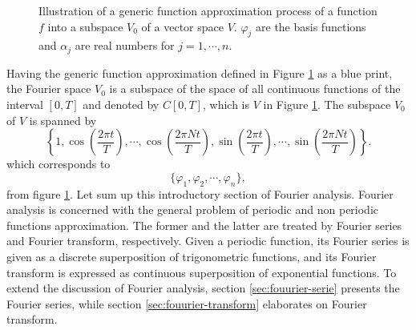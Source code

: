 \documentclass[../Main/thesis.tex]{subfiles}
\begin{document}
\begin{figure}[H]
\begin{center}
\end{center}
\caption{Illustration of a generic function approximation process of a function $f$ into a subspace $V_{0}$ of a vector space $V$. $\varphi_{j}$ are the basis functions and $\alpha_{j}$ are real numbers for $j=1,\cdots,n$.}
\label{figure:il}
\end{figure}

\justify
Having the generic function approximation defined in Figure \ref{figure:il} as a blue print, the Fourier space $V_{0}$ is a subspace of the space of all continuous functions of the interval $[0, T]$ and denoted by $C[0,T] $, which is $V$ in Figure \ref{figure:il}. The subspace $V_{0}$ of $V$ is spanned by 
\begin{equation}
\left\{1, \cos\left( \frac{2\pi t}{T} \right), \cdots,\cos\left( \frac{2\pi Nt}{T} \right), \sin\left( \frac{2\pi t}{T} \right), \cdots,\sin\left( \frac{2\pi Nt}{T} \right)   \right\}. \nonumber
\end{equation}
which corresponds to
\begin{equation}
\{\varphi_{1}, \varphi_{2}, \cdots, \varphi_{n}\}, \nonumber
\end{equation}
from figure \ref{figure:il}. 
\justify
Let sum up this introductory section of Fourier analysis. Fourier analysis is concerned with the general problem of periodic and non periodic functions approximation. The former and the latter are treated by Fourier series and Fourier transform, respectively. Given a periodic function, its Fourier series is given as a discrete superposition of trigonometric functions, and its Fourier transform is expressed as continuous superposition of exponential functions.
To extend the discussion of Fourier analysis, section \ref{sec:fouurier-serie} presents the Fourier series, while section \ref{sec:fouurier-transform} elaborates on Fourier transform.
\end{document}
